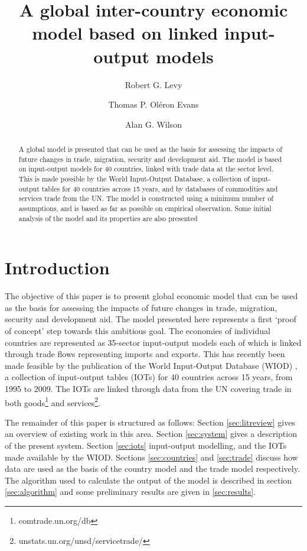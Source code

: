 \documentclass[a4paper]{article}
\title{A global inter-country economic model based on linked input-output models}
\author[*]{Robert G. Levy}
\author[**]{Thomas P. Ol\'{e}ron Evans}
\author[*]{Alan G. Wilson}
\affil[*]{Centre for Advanced Spatial Analysis, UCL Bartlett Faculty of the Built Environment,
90 Tottenham Court Road, London W1T 4TJ, UK}
\affil[**]{Department of Mathematics, University College London, Gower Street, London WC1E 6BT, UK}
\begin{document}
\maketitle

\begin{abstract}
A global model is presented that can be used as the basis for assessing the impacts of future changes in trade, migration, security and development aid.
The model is based on input-output models for 40 countries, linked with trade data at the sector level.
This is made possible by the World Input-Output Database, a collection of input-output tables for 40 countries across 15 years, and by databases of commodities and services trade from the UN.
The model is constructed using a minimum number of assumptions, and is based as far as possible on empirical observation.
Some initial analysis of the model and its properties are also presented
\end{abstract}

\section{Introduction}
The objective of this paper is to present global economic model that can be used as the basis for assessing the impacts of future changes in trade, migration, security and development aid.
The model presented here represents a first `proof of concept' step towards this ambitious goal.
The economies of individual countries are represented as 35-sector input-output models each of which is linked through trade flows representing imports and exports.
This has recently been made feasible by the publication of the World Input-Output Database (WIOD) \parencite{Timmer2012}, a collection of input-output tables (IOTs) for 40 countries across 15 years, from 1995 to 2009.
The IOTs are linked through data from the UN covering trade in both goods\footnote{comtrade.un.org/db} and services\footnote{unstats.un.org/unsd/servicetrade/}.

The remainder of this paper is structured as follows: 
Section \ref{sec:litreview} gives an overview of existing work in this area.
Section \ref{sec:system} gives a description of the present system.
Section \ref{sec:iots} input-output modelling, and the IOTs made available by the WIOD.
Sections \ref{sec:countries} and \ref{sec:trade} discuss how data are used as the basis of the country model and the trade model respectively.
The algorithm used to calculate the output of the model is described in section \ref{sec:algorithm} and some preliminary results are given in \ref{sec:results}.
\end{document}
